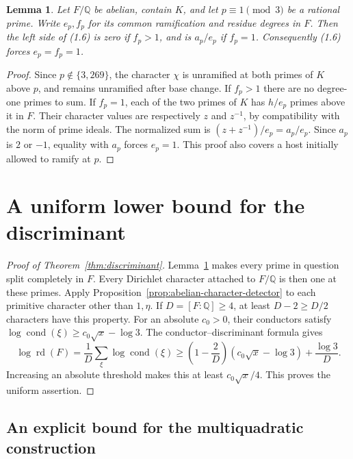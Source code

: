 \documentclass[11pt]{article}
\newtheorem{lemma}[theorem]{Lemma}
\theoremstyle{remark}\newtheorem{remark}[theorem]{Remark}
\newcommand{\Q}{\mathbb Q}
\newcommand{\rd}{\operatorname{rd}}
\newcommand{\cond}{\operatorname{cond}}
\begin{document}
\begin{lemma}\label{lem:forced-splitting}
Let $F/\Q$ be abelian, contain $K$, and let $p\equiv1\pmod3$
be a rational prime. Write $e_p,f_p$ for its common ramification
and residue degrees in $F$. Then the left side of (1.6) is zero
if $f_p>1$, and is $a_p/e_p$ if $f_p=1$.
Consequently (1.6) forces $e_p=f_p=1$.
\end{lemma}
\begin{proof}
Since $p\notin\{3,269\}$, the character $\chi$ is unramified at
both primes of $K$ above $p$, and remains unramified after base
change. If $f_p>1$ there are no degree-one primes to sum.
If $f_p=1$, each of the two primes of $K$ has $h/e_p$ primes
above it in $F$. Their character values are respectively
$z$ and $z^{-1}$, by compatibility with the norm of prime ideals.
The normalized sum is $(z+z^{-1})/e_p=a_p/e_p$.
Since $a_p$ is $2$ or $-1$, equality with $a_p$ forces $e_p=1$.
This proof also covers a host initially allowed to ramify at $p$.
\end{proof}

\section{A uniform lower bound for the discriminant}



\begin{proof}[Proof of Theorem~\ref{thm:discriminant}]
Lemma~\ref{lem:forced-splitting} makes every prime in question
split completely in $F$. Every Dirichlet character attached to
$F/\Q$ is then one at these primes. Apply
Proposition~\ref{prop:abelian-character-detector} to each primitive
character other than $1,\eta$. If $D=[F:\Q]\ge4$, at least
$D-2\ge D/2$ characters have this property. For an absolute
$c_0>0$, their conductors satisfy
$\log\cond(\xi)\ge c_0\sqrt{x}-\log3$.
The conductor--discriminant formula gives
\[
 \log\rd(F)=\frac1D\sum_\xi\log\cond(\xi)
 \ge\left(1-\frac2D\right)(c_0\sqrt{x}-\log3)
                       +\frac{\log3}{D}.
                                                        \tag{6.1}
\]
Increasing an absolute threshold makes this at least
$c_0\sqrt{x}/4$. This proves the uniform assertion.
\end{proof}

\subsection{An explicit bound for the multiquadratic construction}
\end{document}
